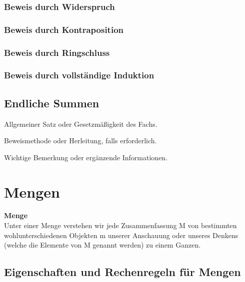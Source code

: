 \documentclass[a4paper,10pt]{article}
\begin{document}
\subsubsection{Beweis durch Widerspruch}

\subsubsection{Beweis durch Kontraposition}

\subsubsection{Beweis durch Ringschluss}

\subsubsection{Beweis durch vollständige Induktion}


\subsection{Endliche Summen}



\begin{satzbox}
Allgemeiner Satz oder Gesetzmäßigkeit des Fachs.
\end{satzbox}
\begin{beweisbox}
Beweismethode oder Herleitung, falls erforderlich.
\end{beweisbox}
\begin{hinweisbox}
Wichtige Bemerkung oder ergänzende Informationen.
\end{hinweisbox}








\section{Mengen}

\begin{definitionbox}
\textbf{Menge} \\
Unter einer Menge verstehen wir jede Zusammenfassung M von bestimmten wohlunterschiedenen Objekten m unserer Anschauung oder unseres Denkens (welche die Elemente von M genannt werden) zu einem Ganzen.
\end{definitionbox}


\subsection{Eigenschaften und Rechenregeln für Mengen}
\end{document}
